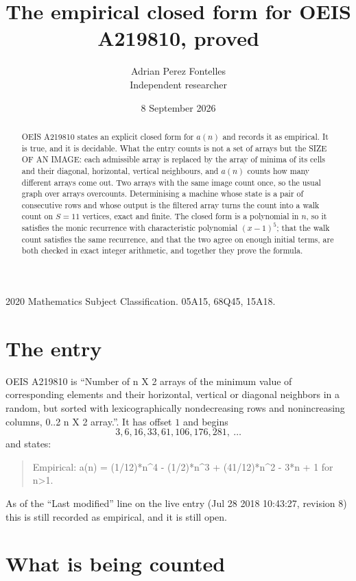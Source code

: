 \documentclass[11pt,a4paper]{article}
\title{The empirical closed form for OEIS A219810, proved}
\author{Adrian Perez Fontelles\\ \small Independent researcher}
\date{8 September 2026}
\theoremstyle{plain}
\theoremstyle{definition}
\begin{document}
\maketitle

\begin{abstract}
OEIS A219810 states an explicit closed form for $a(n)$ and records it as empirical. It is true, and
it is decidable. What the entry counts is not a set of arrays but the SIZE OF AN IMAGE: each
admissible array is replaced by the array of minima of its cells and their diagonal, horizontal, vertical neighbours,
and $a(n)$ counts how many different arrays come out. Two arrays with the same image count
once, so the usual graph over arrays overcounts. Determinising a machine whose state is a pair
of consecutive rows and whose output is the filtered array turns the count into a walk count on
$S=11$ vertices, exact and finite. The closed form is a polynomial in $n$, so it satisfies the
monic recurrence with characteristic polynomial $(x-1)^{5}$; that the walk count
satisfies the same recurrence, and that the two agree on enough initial terms, are both checked
in exact integer arithmetic, and together they prove the formula.
\end{abstract}

\noindent\small 2020 Mathematics Subject Classification. 05A15, 68Q45, 15A18.\normalsize

\section{The entry}

OEIS A219810 is ``Number of n X 2 arrays of the minimum value of corresponding elements and their horizontal, vertical or diagonal neighbors in a random, but sorted with lexicographically nondecreasing rows and nonincreasing columns, 0..2 n X 2 array.''. It has offset $1$ and begins
\[
3, 6, 16, 33, 61, 106, 176, 281,\ \dots
\]
and states:
\begin{quote}
Empirical: a(n) = (1/12)*n\^{}4 - (1/2)*n\^{}3 + (41/12)*n\^{}2 - 3*n + 1 for n>1.
\end{quote}
As of the ``Last modified'' line on the live entry (Jul 28 2018 10:43:27, revision 8)
this is still recorded as empirical, and it is still open.

\section{What is being counted}
\end{document}

